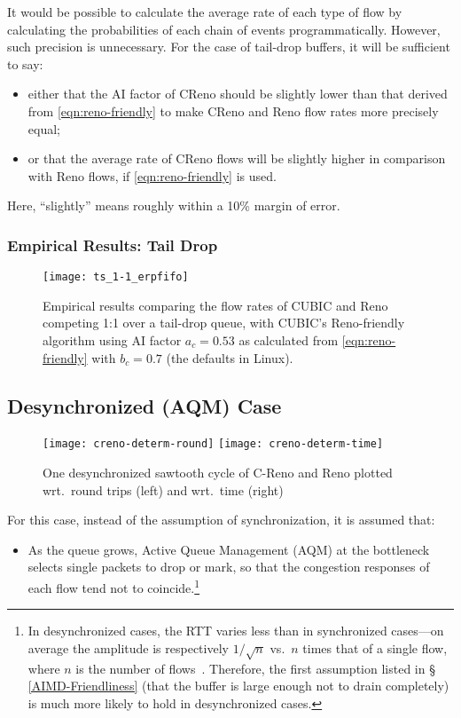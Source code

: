 It would be possible to calculate the average rate of each type of flow by calculating the probabilities of each chain of events programmatically. However, such precision is unnecessary. For the case of tail-drop buffers, it will be sufficient to say:
\begin{itemize}
	\item either that the AI factor of CReno should be slightly lower than that derived from \autoref{eqn:reno-friendly} to make CReno and Reno flow rates more precisely equal;
	\item or that the average rate of CReno flows will be slightly higher in comparison with Reno flows, if \autoref{eqn:reno-friendly} is used.
\end{itemize}
Here, ``slightly''  means roughly within a 10\% margin of error.


\subsubsection{Empirical Results: Tail Drop}\label{empirical-pfifo}

\begin{figure}
	\centering
	\texttt{[image: ts\_1-1\_erpfifo]}
	\caption{Empirical results comparing the flow rates of CUBIC and Reno competing 1:1 over a tail-drop queue, with CUBIC's Reno-friendly algorithm using AI factor \(a_c=0.53\) as calculated from \autoref{eqn:reno-friendly} with \(b_c=0.7\) (the defaults in Linux).}\label{fig:ts_1-1_erpfifo}
\end{figure}


\subsection{Desynchronized (AQM) Case}\label{AQM}
\begin{figure*}
	\centering
	\texttt{[image: creno-determ-round]}
	\texttt{[image: creno-determ-time]}
	\caption{One desynchronized sawtooth cycle of C-Reno and Reno plotted wrt.\ round trips (left) and wrt.\ time (right)}\label{fig:creno-determ}
\end{figure*}

For this case, instead of the assumption of synchronization, it is assumed that:
\begin{itemize}[nosep]
	\item As the queue grows, Active Queue Management (AQM) at the bottleneck selects single packets to drop or mark, so that the congestion responses of each flow tend not to coincide.\footnote{In desynchronized cases, the RTT varies less than in synchronized cases---on average the amplitude is respectively \(1/\sqrt{n}\) vs.\ \(n\) times that of a single flow, where \(n\) is the number of flows~\cite{Appenzeller04:Sizing_buffers}. Therefore, the first assumption listed in \S\,\ref{AIMD-Friendliness} (that the buffer is large enough not to drain completely) is much more likely to hold in desynchronized cases.}
\end{itemize}


